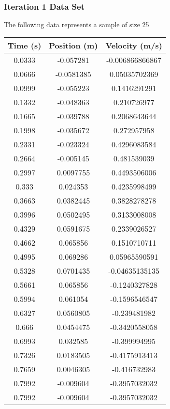 \documentclass{report}
\begin{document}
    \subsubsection{Iteration 1 Data Set}
    \bigbreak \noindent 
    The following data represents a sample of size 25
    \bigbreak \noindent 
        \begin{center}
            \begin{tabular}{c|c|c}
                Time (s) & Position (m) & Velocity (m/s)\\
                \hline
                0.0333&	-0.057281&	-0.006866866867\\
                0.0666&	-0.0581385	&0.05035702369\\
                0.0999&	-0.055223&	0.1416291291\\
                0.1332&	-0.048363&	0.210726977\\
                0.1665&	-0.039788&	0.2068643644\\
                0.1998&	-0.035672&	0.272957958\\
                0.2331&	-0.023324&	0.4296083584\\
                0.2664&	-0.005145&	0.481539039\\
                0.2997&	0.0097755&	0.4493506006\\
                0.333 &  0.024353 &   0.4235998499\\
                0.3663&	0.0382445&	0.3828278278\\
                0.3996&	0.0502495&	0.3133008008\\
                0.4329&	0.0591675&	0.2339026527\\
                0.4662&	0.065856 &   0.1510710711\\
                0.4995&	0.069286 &   0.05965590591\\
                0.5328&	0.0701435&	-0.04635135135\\
                0.5661&	0.065856 &   -0.1240327828\\
                0.5994&	0.061054 &   -0.1596546547\\
                0.6327&	0.0560805&	-0.239481982\\
                0.666 &  0.0454475&	-0.3420558058\\
                0.6993&	0.032585 &   -0.399994995\\
                0.7326&	0.0183505&	-0.4175913413\\
                0.7659&	0.0046305&	-0.416732983\\
                0.7992&	-0.009604&	-0.3957032032\\
                0.7992	& -0.009604&	-0.3957032032 
            \end{tabular}
        \end{center}
\end{document}
